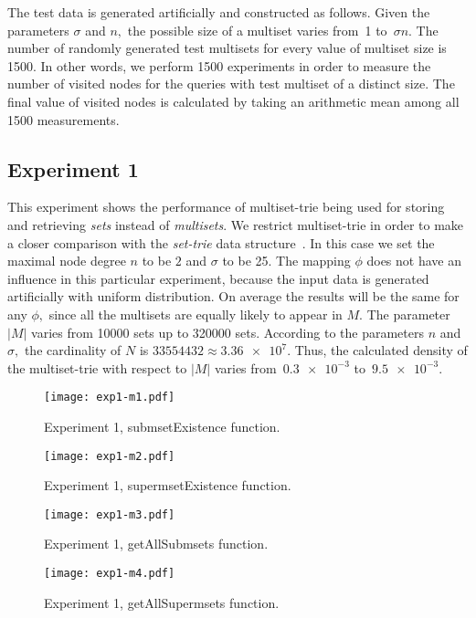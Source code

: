 The test data is generated artificially and constructed as follows. Given the 
parameters $\sigma$ and $n,$ the possible size of a multiset varies from~1 
to~$\sigma n.$ The number of randomly generated test multisets for every 
value of multiset size is 1500. In other words, we perform 1500 experiments 
in order to measure the number of visited nodes for the queries with test multiset 
of a distinct size. The final value of visited nodes is calculated by taking an 
arithmetic mean among all 1500 measurements.


\subsection{Experiment 1} \label{s:exp1}
This experiment shows the performance of multiset-trie being used for storing 
and retrieving \emph{sets} instead of \emph{multisets}. We restrict multiset-trie in order 
to make a closer comparison with the \emph{set-trie} data structure~\cite{savnik2013index}.
In this case we set the maximal node degree $n$ to be $2$ and $\sigma$ to be 25. 
The mapping $\phi$ does not have an influence in this particular experiment, 
because the input data is generated artificially with uniform distribution. On 
average the results will be the same for any $\phi,$ since all the multisets are 
equally likely to appear in $M.$ The parameter $|M|$ varies from 10000 sets up 
to 320000 sets. According to the parameters $n$ and $\sigma,$ the cardinality of 
$N$ is $33554432\approx \num{3.36e+7}.$ Thus, the calculated density of the 
multiset-trie with respect to $|M|$ varies from~$\num{0.3e-3}$ to~$\num{9.5e-3}.$


\begin{figure}
\center
\texttt{[image: exp1-m1.pdf]}
\caption{Experiment 1, submsetExistence function.}
\label{fig:e1m1}
\end{figure}

\begin{figure}
\center
\texttt{[image: exp1-m2.pdf]}
\caption{Experiment 1, supermsetExistence function.}
\label{fig:e1m2}
\end{figure}

\begin{figure}
\center
\texttt{[image: exp1-m3.pdf]}
\caption{Experiment 1, getAllSubmsets function.}
\label{fig:e1m3}
\end{figure}

\begin{figure}
\center
\texttt{[image: exp1-m4.pdf]}
\caption{Experiment 1, getAllSupermsets function.}
\label{fig:e1m4}
\end{figure}

